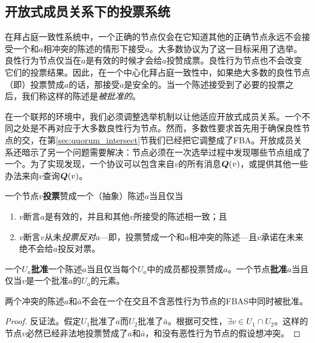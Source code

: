 \subsection{开放式成员关系下的投票系统}

在拜占庭一致性系统中，一个正确的节点仅会在它知道其他的正确节点永远不会接受一个和$a$相冲突的陈述的情形下接受$a$。大多数协议为了这一目标采用了选举。良性行为节点仅当在$a$是有效的时候才会给$a$投赞成票。良性行为节点也不会改变它们的投票结果。因此，在一个中心化拜占庭一致性中，如果绝大多数的良性节点（即{\quorum}）投票赞成$a$的话，那接受$a$是安全的。当一个陈述接受到了必要的投票之后，我们称这样的陈述是\textit{被批准的}。

在一个联邦的环境中，我们必须调整选举机制以让他适应开放式成员关系。一个不同之处是{\quorum}不再对应于大多数良性行为节点。然而，多数性要求首先用于确保良性节点的{\quorum}交，在第\ref{sec:quorum_intersect}节我们已经把它调整成了FBA。开放成员关系还暗示了另一个问题需要解决：节点必须在一次选举过程中发现哪些节点组成了一个{\quorum}。为了实现{\quorum}发现，一个协议可以包含来自$v$的所有消息${\bm Q}(v)$，或提供其他一些办法来向$v$查询${\bm Q}(v)$。

\begin{definition}[投票]
	一个节点$v$\textbf{投票}赞成一个（抽象）陈述$a$当且仅当
	\begin{enumerate}
		\item $v$断言$a$是有效的，并且和其他$v$所接受的陈述相一致；且
		\item $v$断言$v$从未\textit{投票反对}$a$---即，投票赞成一个和$a$相冲突的陈述---且$v$承诺在未来绝不会给$a$投反对票。
	\end{enumerate}
\end{definition}

\begin{definition}[批准]
	一个{\quorum}$U_a$\textbf{批准}一个陈述$a$当且仅当每个$U_a$中的成员都投票赞成$a$。一个节点\textbf{批准}$a$当且仅当$v$是一个批准$a$的{\quorum}$U_a$的元素。
\end{definition}

\begin{theorem}\label{th4}
	两个冲突的陈述$a$和$\bar a$不会在一个在{\quorum}交且不含恶性行为节点的FBAS中同时被批准。
\end{theorem}

\begin{proof}
	反证法。假定{\quorum}$U_1$批准了$a$而{\quorum}$U_2$批准了$\bar a$。根据{\quorum}可交性，$\exists v\in U_1\cap U_2$。这样的节点$v$必然已经非法地投票赞成了$a$和$\bar a$，和没有恶性行为节点的假设想冲突。
\end{proof}

